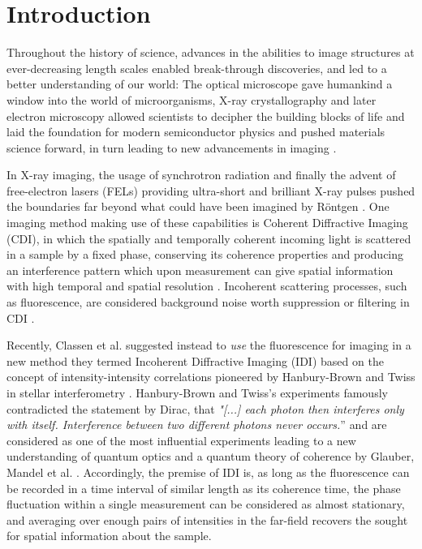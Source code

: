 \chapter{Introduction}
Throughout the history of science, advances in the abilities to image structures at ever-decreasing length scales enabled break-through discoveries, and led to a better understanding of our world:
The optical microscope gave humankind a window into the world of microorganisms, X-ray crystallography and later electron microscopy allowed scientists to decipher the building blocks of life and laid the foundation for modern semiconductor physics and pushed materials science forward, in turn leading to new advancements in imaging \cite{hooke1665,laue1915,ruska1939,watson1953,hovmoeller1984}.

In X-ray imaging, the usage of synchrotron radiation and finally the advent of free-electron lasers (FELs) providing ultra-short and brilliant X-ray pulses pushed the boundaries far beyond what could have been imagined by Röntgen \cite{cloetens1996,emma2010}. One imaging method making use of these capabilities is Coherent Diffractive Imaging (CDI), in which the spatially and temporally coherent incoming light is scattered in a sample by a fixed phase, conserving its coherence properties and producing an interference pattern which upon measurement can give spatial information with high temporal and spatial resolution \cite{seibert2011,bostedt2010,barke2015}. Incoherent scattering processes, such as fluorescence, are considered background noise worth suppression or filtering in CDI \cite{schultz2013chapter7}. 

Recently, Classen et al. suggested instead to \textit{use} the fluorescence for imaging in a new method they termed Incoherent Diffractive Imaging (IDI) \cite{classen2017} based on the concept of intensity-intensity correlations pioneered by Hanbury-Brown and Twiss in stellar interferometry \cite{hanbury1956}.  Hanbury-Brown and Twiss's experiments famously contradicted the statement by Dirac, that \textit{"[...] each photon then interferes only with itself. Interference between two different photons never occurs.}” \cite{dirac1958} and are considered as one of the most influential experiments leading to a new understanding of quantum optics and a quantum theory of coherence by Glauber, Mandel et al. \cite{glauber1963,mandel1959, hong1987,glauber2006}.  Accordingly, the premise of IDI is, as long as the fluorescence can be recorded in a time interval of similar length as its coherence time, the phase fluctuation within a single measurement can be considered as almost stationary, and averaging over enough pairs of intensities in the far-field recovers the sought for spatial information about the sample.

